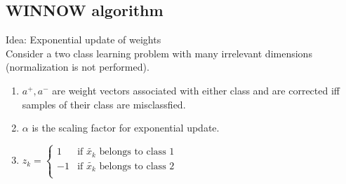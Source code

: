 \documentclass[main]{subfiles}
\begin{document}
\subsection{WINNOW algorithm}
Idea: Exponential update of weights\\
Consider a two class learning problem with many irrelevant
dimensions (normalization is not performed).
\begin{enumerate}
\item \(a^+ , a^-\) are weight vectors associated with either class and are corrected iff samples of their class are misclassfied.
\item \(\alpha\) is the scaling factor for exponential update.
\item \(z_k =
\begin{cases}
1 & \mbox{if } \tilde{x_k} \text{ belongs to class 1}\\
-1 & \mbox{if } \tilde{x_k} \text{ belongs to class 2}\\
\end{cases}
\)
\end{enumerate}
\end{document}
